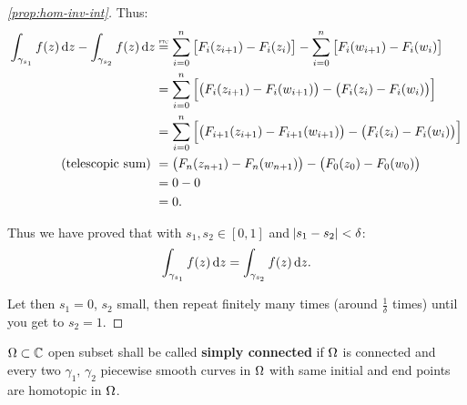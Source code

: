 \begin{proof}[\ref{prop:hom-inv-int}]
 
Thus:
\begin{align*}
    \int_{\gamma_{s_1}} f(z) \dif z - \int_{\gamma_{s_2}} f(z) \dif z & \overset{    \scalebox{0.35}{FTC}   }{=} \sum_{i=0}^n \left[ F_i (z_{i+1} ) - F_i (z_{i} )\right] - \sum_{i=0}^n \left[ F_i (w_{i+1} ) - F_i (w_{i} )\right]\\
    &= \sum_{i=0}^n \left[ \big( F_i (z_{i+1}) - F_i (w_{i+1} ) \big) - \big( F_i (z_{i}) - F_i (w_{i} ) \big) \right]\\
    &= \sum_{i=0}^n \left[ \big( F_{i+1} (z_{i+1}) - F_{i+1} (w_{i+1} ) \big) - \big( F_i (z_{i}) - F_i (w_{i} ) \big) \right]\\
    \text{(telescopic sum) } &= \big( F_n (z_{n+1}) - F_n ( w_{n+1} ) \big) - \big( F_0 (z_{0}) - F_0 ( w_{0} ) \big)\\
    &= 0 - 0\\
    &= 0.
\end{align*}
 
Thus we have proved that with $s_1, s_2 \in [0,1]$ and $\abs{s_1 - s_2} < \delta$:
\begin{align*}
\int_{\gamma_{s_1}} f(z) \dif z = \int_{\gamma_{s_2}} f(z) \dif z.
\end{align*}

\begin{center}
\end{center}

Let then $s_1 =0$, $s_2$ small, then repeat finitely many times (around $\frac{1}{\delta}$ times) until you get to $s_2 = 1$.

\end{proof}


\begin{definition}
$\Omega \subset \mathbb{C}$ open subset shall be called \textbf{simply connected} if $\Omega$ is connected and every two $\gamma_1, \, \gamma_2$ piecewise smooth curves in $\Omega$ with same initial and end points are homotopic in $\Omega$.
\end{definition}


